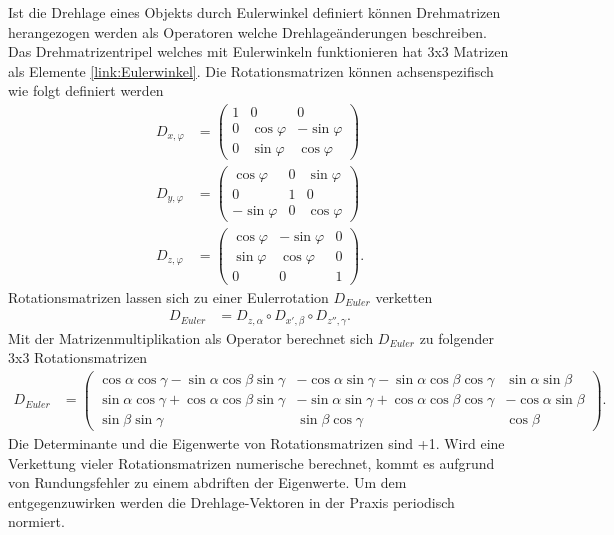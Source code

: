 Ist die Drehlage eines Objekts durch Eulerwinkel definiert können Drehmatrizen herangezogen werden als Operatoren welche Drehlageänderungen beschreiben. Das Drehmatrizentripel welches mit Eulerwinkeln funktionieren hat 3x3 Matrizen als Elemente \ref{link:Eulerwinkel}. Die Rotationsmatrizen können achsenspezifisch wie folgt definiert werden
\begin{align}
	D_{x,\varphi} &= \begin{pmatrix}
		1 & 0 & 0\\
		0 & \cos{\varphi} & -\sin{\varphi}\\
		0 & \sin{\varphi} & \cos{\varphi}
	\end{pmatrix}\\
	D_{y,\varphi} &= \begin{pmatrix}
		\cos{\varphi} & 0 & \sin{\varphi}\\
		0 & 1 & 0\\
		-\sin{\varphi} & 0 & \cos{\varphi} 
	\end{pmatrix}\\
	D_{z,\varphi} &= \begin{pmatrix}
		\cos{\varphi} & -\sin{\varphi} & 0\\
		\sin{\varphi} & \cos{\varphi} & 0\\
		0 & 0 & 1
	\end{pmatrix}.
\end{align}
Rotationsmatrizen lassen sich zu einer Eulerrotation $D_{Euler}$ verketten
\begin{align}
	D_{Euler} &= D_{z, \alpha}\circ D_{x', \beta}\circ D_{z'', \gamma}. 
\end{align}
Mit der Matrizenmultiplikation als Operator berechnet sich $D_{Euler}$ zu folgender 3x3 Rotationsmatrizen
\begin{align}
	D_{Euler} &= \begin{pmatrix}
		\cos{\alpha}\cos{\gamma} - \sin{\alpha}\cos{\beta}\sin{\gamma} & -\cos{\alpha}\sin{\gamma} - \sin{\alpha}\cos{\beta}\cos{\gamma} & \sin{\alpha}\sin{\beta}\\
		\sin{\alpha}\cos{\gamma} + \cos{\alpha}\cos{\beta}\sin{\gamma} & -\sin{\alpha}\sin{\gamma} + \cos{\alpha}\cos{\beta}\cos{\gamma} & -\cos{\alpha}\sin{\beta}\\
		\sin{\beta}\sin{\gamma} & \sin{\beta}\cos{\gamma} & \cos{\beta}
	\end{pmatrix}.
\end{align}
Die Determinante und die Eigenwerte von Rotationsmatrizen sind +1. Wird eine Verkettung vieler Rotationsmatrizen numerische berechnet, kommt es aufgrund von Rundungsfehler zu einem abdriften der Eigenwerte. Um dem entgegenzuwirken werden die Drehlage-Vektoren in der Praxis periodisch normiert.

